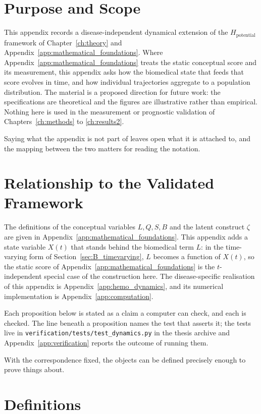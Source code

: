 \section{Purpose and Scope}
\label{sec:B_purpose}
This appendix records a disease-independent dynamical extension of the
$H_{\text{potential}}$ framework of Chapter~\ref{ch:theory} and
Appendix~\ref{app:mathematical_foundations}. Where Appendix~\ref{app:mathematical_foundations}
treats the static conceptual score and its measurement, this appendix asks how
the biomedical state that feeds that score evolves in time, and how individual
trajectories aggregate to a population distribution. The material is a proposed
direction for future work: the specifications are theoretical and the figures
are illustrative rather than empirical. Nothing here is used in the measurement
or prognostic validation of Chapters~\ref{ch:methods} to \ref{ch:results2}.

Saying what the appendix is not part of leaves open what it is attached to, and
the mapping between the two matters for reading the notation.

\section{Relationship to the Validated Framework}
\label{sec:B_relationship}
The definitions of the conceptual variables $L,Q,S,B$ and the latent construct
$\zeta$ are given in Appendix~\ref{app:mathematical_foundations}. This appendix
adds a state variable $X(t)$ that stands behind the biomedical term $L$: in the
time-varying form of Section~\ref{sec:B_timevarying}, $L$ becomes a function of
$X(t)$, so the static score of Appendix~\ref{app:mathematical_foundations} is the
$t$-independent special case of the construction here. The disease-specific
realisation of this appendix is Appendix~\ref{app:hemo_dynamics}, and its
numerical implementation is Appendix~\ref{app:computation}.

Each proposition below is stated as a claim a computer can check, and each is
checked. The line beneath a proposition names the test that asserts it; the
tests live in \texttt{verification/tests/test\_dynamics.py} in the thesis
archive and Appendix~\ref{app:verification} reports the outcome of running
them.

With the correspondence fixed, the objects can be defined precisely enough to
prove things about.

\section{Definitions}
\label{sec:B_definitions}

